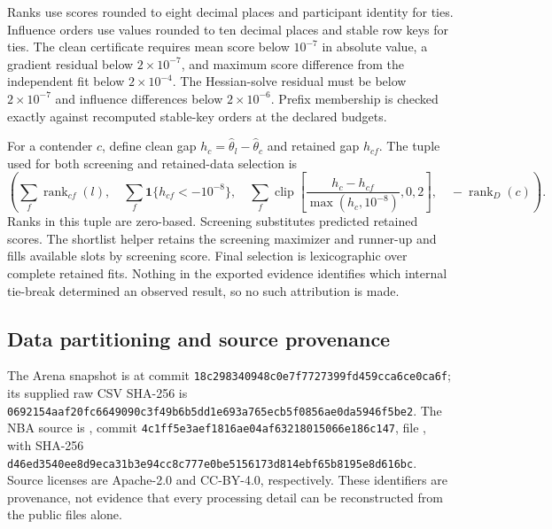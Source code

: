 \documentclass{article}
\begin{document}
Ranks use scores rounded to eight decimal places and participant identity for ties. Influence orders use values rounded to ten decimal places and stable row keys for ties. The clean certificate requires mean score below $10^{-7}$ in absolute value, a gradient residual below $2\times10^{-7}$, and maximum score difference from the independent fit below $2\times10^{-4}$. The Hessian-solve residual must be below $2\times10^{-7}$ and influence differences below $2\times10^{-6}$. Prefix membership is checked exactly against recomputed stable-key orders at the declared budgets.

For a contender $c$, define clean gap $h_c=\widehat\theta_l-\widehat\theta_c$ and retained gap $h_{cf}$. The tuple used for both screening and retained-data selection is
\begin{equation}
 \left(\sum_f\operatorname{rank}_{cf}(l),\quad
       \sum_f\mathbf{1}\{h_{cf}<-10^{-8}\},\quad
       \sum_f\operatorname{clip}\left[\frac{h_c-h_{cf}}{\max(h_c,10^{-8})},0,2\right],\quad
       -\operatorname{rank}_{D}(c)\right).
\end{equation}
Ranks in this tuple are zero-based. Screening substitutes predicted retained scores. The shortlist helper retains the screening maximizer and runner-up and fills available slots by screening score. Final selection is lexicographic over complete retained fits. Nothing in the exported evidence identifies which internal tie-break determined an observed result, so no such attribution is made.

\subsection{Data partitioning and source provenance}
The Arena snapshot is  at commit \nolinkurl{18c298340948c0e7f7727399fd459cca6ce0ca6f}; its supplied raw CSV SHA-256 is \nolinkurl{0692154aaf20fc6649090c3f49b6b5dd1e693a765ecb5f0856ae0da5946f5be2}. The NBA source is , commit \nolinkurl{4c1ff5e3aef1816ae04af63218015066e186c147}, file , with SHA-256 \nolinkurl{d46ed3540ee8d9eca31b3e94cc8c777e0be5156173d814ebf65b8195e8d616bc}. Source licenses are Apache-2.0 and CC-BY-4.0, respectively. These identifiers are provenance, not evidence that every processing detail can be reconstructed from the public files alone.
\end{document}
